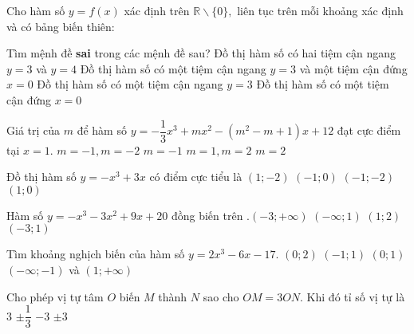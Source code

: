 \begin{ex}%
Cho hàm số $y = f(x)$ xác định trên $\mathbb{R}\backslash \{0\}, $ liên tục trên mỗi khoảng xác định và có bảng biến thiên:
\begin{center}
\end{center}
Tìm mệnh đề \textbf{sai} trong các mệnh đề sau?
\choice
{\True Đồ thị hàm số có hai tiệm cận ngang $y = 3$ và $y = 4$}
{Đồ thị hàm số có một tiệm cận ngang $y = 3$ và một tiệm cận đứng $x = 0$}
{Đồ thị hàm số có một tiệm cận ngang $y = 3$}
{Đồ thị hàm số có một tiệm cận đứng $x = 0$}
\end{ex}
\begin{ex}%
Giá trị của $m$ để hàm số $y = - \dfrac{1}{3}x^3 + mx^2 - \left(m^2 - m + 1\right)x + 12$ đạt cực điểm tại $x=1$.
\choice
{$m = - 1, m = - 2$}
{$m = - 1$}
{$m = 1, m = 2$}
{\True $m = 2$}
\end{ex}
\begin{ex}%
Đồ thị hàm số $y = - x^3 + 3x$ có điểm cực tiểu là
\choice
{$(1; - 2)$}
{$\left( - 1; 0\right)$}
{\True $\left( - 1; - 2\right)$}
{$\left(1; 0\right)$}
\end{ex}
\begin{ex}%
Hàm số $y = - x^3 - 3x^2 + 9x + 20$ đồng biến trên
\choice
{$. \left( - 3; + \infty\right)$}
{$\left( - \infty; 1\right)$}
{$\left(1; 2\right)$}
{\True $\left( - 3; 1\right)$}
\end{ex}
\begin{ex}%
Tìm khoảng nghịch biến của hàm số $y = 2x^3 - 6x - 17$.
\choice
{$\left(0; 2\right)$}
{\True $\left( - 1; 1\right)$}
{$\left(0; 1\right)$}
{$\left( - \infty; - 1\right)$ và $(1; + \infty)$}
\end{ex}
\begin{ex}%
Cho phép vị tự tâm $O$ biến $M$ thành $N$ sao cho $OM = 3ON$. Khi đó tỉ số vị tự là
\choice
{$ 3 $}
{\True $\pm \dfrac{1}{3}$}
{$ - 3$}
{$\pm 3$}
\end{ex}
